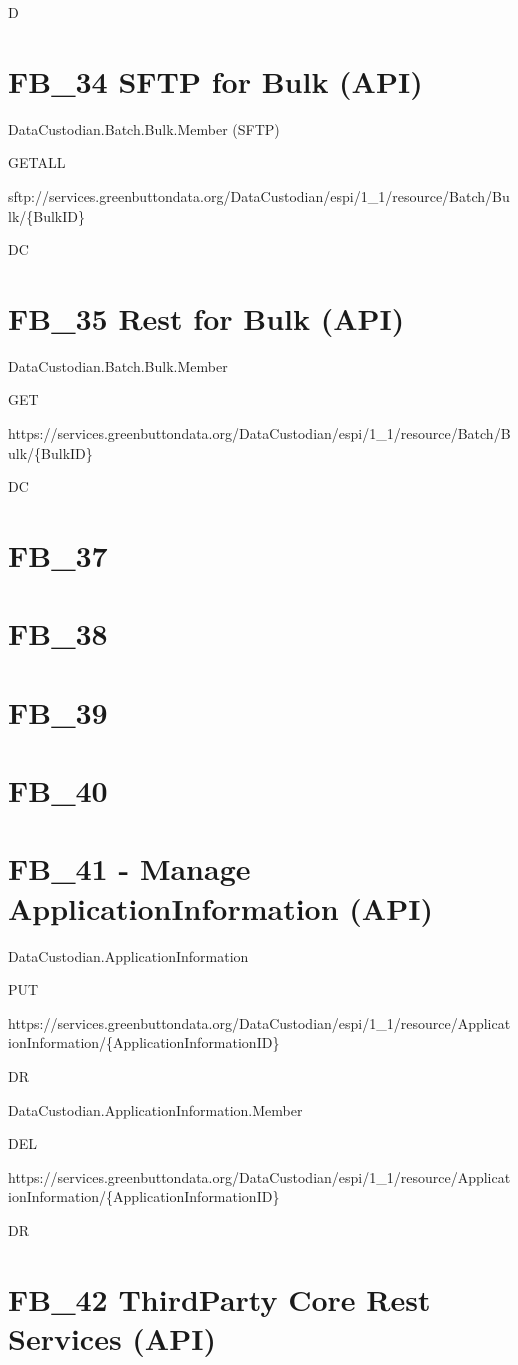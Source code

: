 \documentclass[a4paper,12pt,single,pdftex]{scrbook}
\begin{document}
D\chapter{FB\_34 SFTP for Bulk (API)}


DataCustodian.Batch.Bulk.Member (SFTP)

GETALL

sftp://services.greenbuttondata.org/DataCustodian/espi/1\_1/resource/Batch/Bulk/\{BulkID\}

DC\chapter{FB\_35 Rest for Bulk (API)}


DataCustodian.Batch.Bulk.Member

GET

https://services.greenbuttondata.org/DataCustodian/espi/1\_1/resource/Batch/Bulk/\{BulkID\}

DC\chapter{FB\_37}
\chapter{FB\_38}
\chapter{FB\_39}
\chapter{FB\_40}
\chapter{FB\_41 - Manage ApplicationInformation (API)}


DataCustodian.ApplicationInformation

PUT

https://services.greenbuttondata.org/DataCustodian/espi/1\_1/resource/ApplicationInformation/\{ApplicationInformationID\}

DR

DataCustodian.ApplicationInformation.Member

DEL

https://services.greenbuttondata.org/DataCustodian/espi/1\_1/resource/ApplicationInformation/\{ApplicationInformationID\}

DR\chapter{FB\_42 ThirdParty Core Rest Services (API)}
\end{document}
